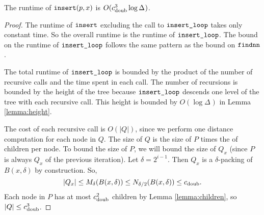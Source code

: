 \documentclass[thesis.tex]{subfiles}
\newcommand{\aspect}[1]{\Delta_{#1}}
\newcommand{\cdoub}{c_\textnormal{doub}}
\newcommand{\findnn}{\mkprocedure{findnn}}
\newcommand{\ctinsert}{\ensuremath{\textnormal{\ttfamily insert}}}
\newcommand{\ctinsertloop}{\ensuremath{\textnormal{\ttfamily insert\_loop}}}
\begin{document}
\begin{theorem}
    The runtime of $\ctinsert(p,x)$ is $O(\cdoub^3 \log\aspect{})$.
\end{theorem}

\begin{proof}
    The runtime of $\ctinsert$ excluding the call to $\ctinsertloop$ takes only constant time.
    So the overall runtime is the runtime of $\ctinsertloop$.
    The bound on the runtime of $\ctinsertloop$ follows the same pattern as the bound on $\findnn$.

    The total runtime of $\ctinsertloop$ is bounded by the product of the number of recursive calls and the time spent in each call.
    The number of recursions is bounded by the height of the tree because $\ctinsertloop$ descends one level of the tree with each recursive call. 
    This height is bounded by $O(\log\aspect{})$ in Lemma \ref{lemma:height}.

    The cost of each recursive call is $O(|Q|)$,
    since we perform one distance computation for each node in $Q$.
    The size of $Q$ is the size of $P$ times the of children per node.
    To bound the size of $P$, we will bound the size of $Q_x$ 
    (since $P$ is always $Q_x$ of the previous iteration).
    Let $\delta=2^{i-1}$.
    Then $Q_x$ is a $\delta$-packing of $B(x,\delta)$ by construction.
    So,
    \begin{equation}
        |Q_x| \le M_\delta(B(x,\delta)) \le N_{\delta/2}(B(x,\delta)) \le \cdoub.
    \end{equation}
    Each node in $P$ has at most $\cdoub^2$ children by Lemma \ref{lemma:children},
    so $|Q| \le \cdoub^3$.
\end{proof}

\end{document}
